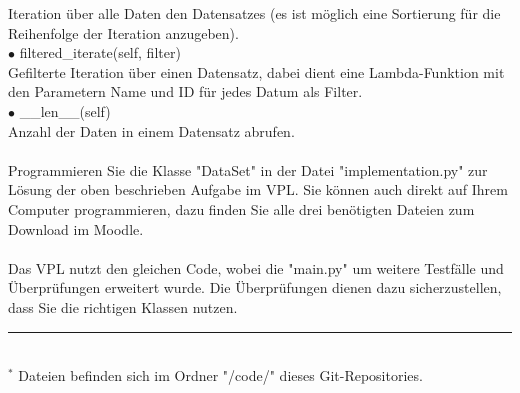 \documentclass[
oneside,
12pt,
a4paper,
parskip=full
]{scrartcl}
\begin{document}
\hspace*{1cm} Iteration über alle Daten den Datensatzes (es ist möglich eine Sortierung für die Reihenfolge der Iteration anzugeben).\\ 
$\bullet$ filtered\_iterate(self, filter)\\
\hspace*{1cm} Gefilterte Iteration über einen Datensatz, dabei dient eine Lambda-Funktion mit den Parametern Name und ID für jedes Datum als Filter.\\
$\bullet$ \_\_len\_\_(self)\\
\hspace*{1cm} Anzahl der Daten in einem Datensatz abrufen.\\
\\
Programmieren Sie die Klasse "DataSet" in der Datei "implementation.py" zur Lösung der oben beschrieben Aufgabe im VPL.
Sie können auch direkt auf Ihrem Computer programmieren, dazu finden Sie alle drei benötigten Dateien zum Download im Moodle.\\
\\
Das VPL nutzt den gleichen Code, wobei die "main.py" um weitere Testfälle und Überprüfungen erweitert wurde.
Die Überprüfungen dienen dazu sicherzustellen, dass Sie die richtigen Klassen nutzen.\\
%
\hrule\hfill\\[0.2cm]
$^*$ Dateien befinden sich im Ordner "/code/" dieses Git-Repositories.\\
\end{document}
